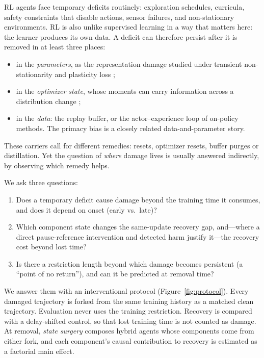 \documentclass[10pt]{article} %
\begin{document}
RL agents face temporary deficits routinely: exploration schedules, curricula, safety constraints that disable actions, sensor failures, and non-stationary environments. RL is also unlike supervised learning in a way that matters here: the learner produces its own data. A deficit can therefore persist after it is removed in at least three places:
\begin{itemize}
\item in the \emph{parameters}, as the representation damage studied under transient non-stationarity \citep{igl2021transient} and plasticity loss \citep{lyle2022capacity,lyle2023plasticity,dohare2024loss,klein2024survey};
\item in the \emph{optimizer state}, whose moments can carry information across a distribution change \citep{dohare2023collapse,xu2026optimizer};
\item in the \emph{data}: the replay buffer, or the actor--experience loop of on-policy methods. The primacy bias \citep{nikishin2022primacy} is a closely related data-and-parameter story.
\end{itemize}
These carriers call for different remedies: resets, optimizer resets, buffer purges or distillation. Yet the question of \emph{where} damage lives is usually answered indirectly, by observing which remedy helps.

We ask three questions:
\begin{enumerate}[label=\textbf{Q\arabic*.}]
\item Does a temporary deficit cause damage beyond the training time it consumes, and does it depend on onset (early vs.\ late)?
\item Which component state changes the same-update recovery gap, and---where a direct pause-reference intervention and detected harm justify it---the recovery cost beyond lost time?
\item Is there a restriction length beyond which damage becomes persistent (a ``point of no return''), and can it be predicted at removal time?
\end{enumerate}

We answer them with an interventional protocol (Figure~\ref{fig:protocol}). Every damaged trajectory is forked from the same training history as a matched clean trajectory. Evaluation never uses the training restriction. Recovery is compared with a delay-shifted control, so that lost training time is not counted as damage. At removal, \emph{state surgery} composes hybrid agents whose components come from either fork, and each component's causal contribution to recovery is estimated as a factorial main effect.
\end{document}
